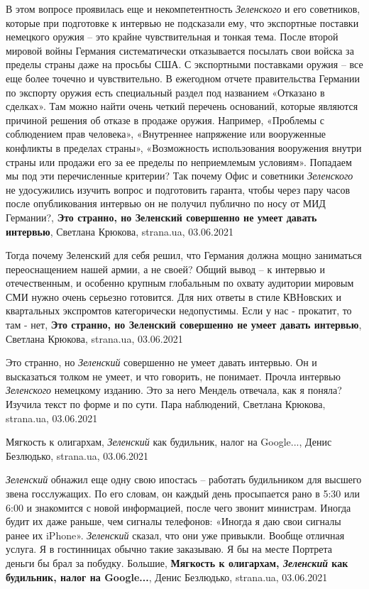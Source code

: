 В этом вопросе проявилась еще и некомпетентность \emph{Зеленского} и его советников,
которые при подготовке к интервью не подсказали ему, что экспортные поставки
немецкого оружия – это крайне чувствительная и тонкая тема. После второй
мировой войны Германия систематически отказывается посылать свои войска за
пределы страны даже на просьбы США. С экспортными поставками оружия – все еще
более точечно и чувствительно. В ежегодном отчете правительства Германии по
экспорту оружия есть специальный раздел под названием «Отказано в сделках». Там
можно найти очень четкий перечень оснований, которые являются причиной решения
об отказе в продаже оружия. Например, «Проблемы с соблюдением прав человека»,
«Внутреннее напряжение или вооруженные конфликты в пределах страны»,
«Возможность использования вооружения внутри страны или продажи его за ее
пределы по неприемлемым условиям». Попадаем мы под эти перечисленные критерии?
Так почему Офис и советники \emph{Зеленского} не удосужились изучить вопрос и
подготовить гаранта, чтобы через пару часов после опубликования интервью он не
получил публично по носу от МИД Германии?,
\textbf{Это странно, но Зеленский совершенно не умеет давать интервью}, Светлана Крюкова, 
strana.ua, 03.06.2021

Тогда почему Зеленский для себя решил, что Германия должна мощно заниматься
переоснащением нашей армии, а не своей?  Общий вывод – к интервью и
отечественным, и особенно крупным глобальным по охвату аудитории мировым СМИ
нужно очень серьезно готовится. Для них ответы в стиле КВНовских и квартальных
экспромтов категорически недопустимы. Если у нас - прокатит, то там - нет,
\textbf{Это странно, но Зеленский совершенно не умеет давать интервью}, Светлана Крюкова, 
strana.ua, 03.06.2021

Это странно, но \emph{Зеленский} совершенно не умеет давать интервью.  Он и
высказаться толком не умеет, и что говорить, не понимает. Прочла интервью
\emph{Зеленского} немецкому изданию. Это за него Мендель отвечала, как я поняла?
Изучила текст по форме и по сути. Пара наблюдений,
Светлана Крюкова, strana.ua, 03.06.2021

Мягкость к олигархам, \emph{Зеленский} как будильник, налог на Google..., Денис
Безлюдько, strana.ua, 03.06.2021

\emph{Зеленский} обнажил еще одну свою ипостась – работать будильником для высшего
звена госслужащих. По его словам, он каждый день просыпается рано в 5:30 или
6:00 и знакомится с новой информацией, после чего звонит министрам. Иногда
будит их даже раньше, чем сигналы телефонов: «Иногда я даю свои сигналы ранее
их iPhone». \emph{Зеленский} сказал, что они уже привыкли. Вообще отличная услуга. Я в
гостинницах обычно такие заказываю. Я бы на месте Портрета деньги бы брал за
побудку. Большие,
\textbf{Мягкость к олигархам, \emph{Зеленский} как будильник, налог на Google...}, Денис
Безлюдько, strana.ua, 03.06.2021


